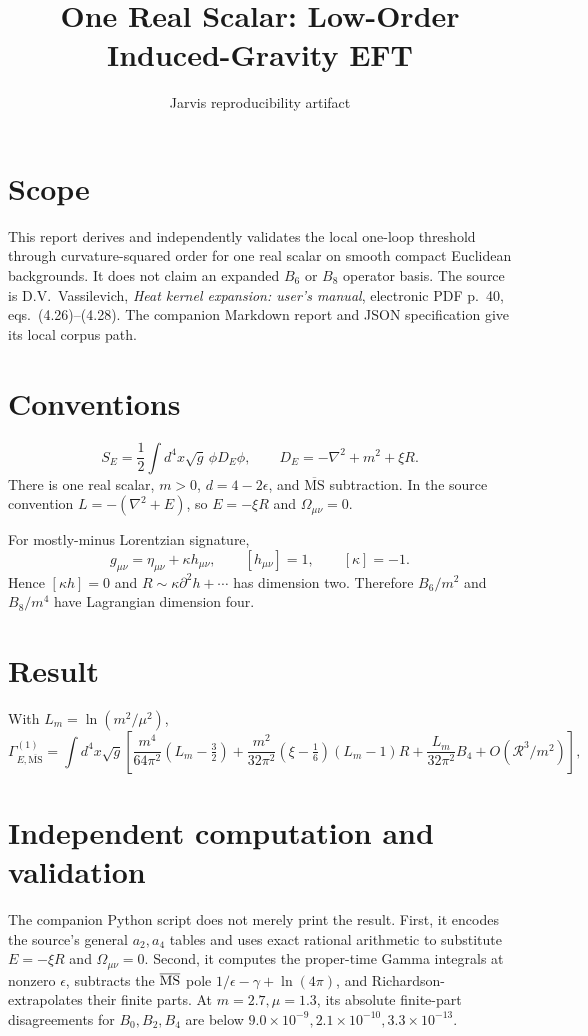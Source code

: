 \documentclass[11pt]{article}
\title{One Real Scalar: Low-Order Induced-Gravity EFT}
\author{Jarvis reproducibility artifact}
\date{}
\begin{document}
\maketitle

\section*{Scope}
This report derives and independently validates the local one-loop threshold
through curvature-squared order for one real scalar on smooth compact
Euclidean backgrounds. It does not claim an expanded $B_6$ or $B_8$ operator
basis.
The source is D.V.~Vassilevich, \emph{Heat kernel expansion: user's manual},
electronic PDF p.~40, eqs.~(4.26)--(4.28). The companion Markdown report and
JSON specification give its local corpus path.

\section*{Conventions}
\[
 S_E=\frac12\int d^4x\sqrt g\,\phi D_E\phi,\qquad
 D_E=-\nabla^2+m^2+\xi R.
\]
There is one real scalar, $m>0$, $d=4-2\epsilon$, and
$\overline{\mathrm{MS}}$ subtraction. In the source convention
$L=-(\nabla^2+E)$, so $E=-\xi R$ and $\Omega_{\mu\nu}=0$.

For mostly-minus Lorentzian signature,
\[
 g_{\mu\nu}=\eta_{\mu\nu}+\kappa h_{\mu\nu},\qquad
 [h_{\mu\nu}]=1,\qquad [\kappa]=-1.
\]
Hence $[\kappa h]=0$ and
$R\sim\kappa\partial^2h+\cdots$ has dimension two. Therefore
$B_6/m^2$ and $B_8/m^4$ have Lagrangian dimension four.

\section*{Result}
With $L_m=\ln(m^2/\mu^2)$,
\[
 \Gamma_{E,\overline{\mathrm{MS}}}^{(1)}
 =\int d^4x\sqrt g\left[
 \frac{m^4}{64\pi^2}(L_m-\tfrac32)
 +\frac{m^2}{32\pi^2}(\xi-\tfrac16)(L_m-1)R
 +\frac{L_m}{32\pi^2}B_4+O(\mathcal R^3/m^2)\right],
\]

\section*{Independent computation and validation}
The companion Python script does not merely print the result. First, it
encodes the source's general $a_2,a_4$ tables and uses exact rational
arithmetic to substitute $E=-\xi R$ and $\Omega_{\mu\nu}=0$. Second, it
computes the proper-time Gamma integrals at nonzero $\epsilon$, subtracts the
$\overline{\rm MS}$ pole
$1/\epsilon-\gamma+\ln(4\pi)$, and Richardson-extrapolates their finite
parts. At $m=2.7,\mu=1.3$, its absolute finite-part disagreements for
$B_0,B_2,B_4$ are below
$9.0\times10^{-9},2.1\times10^{-10},3.3\times10^{-13}$.
\end{document}
